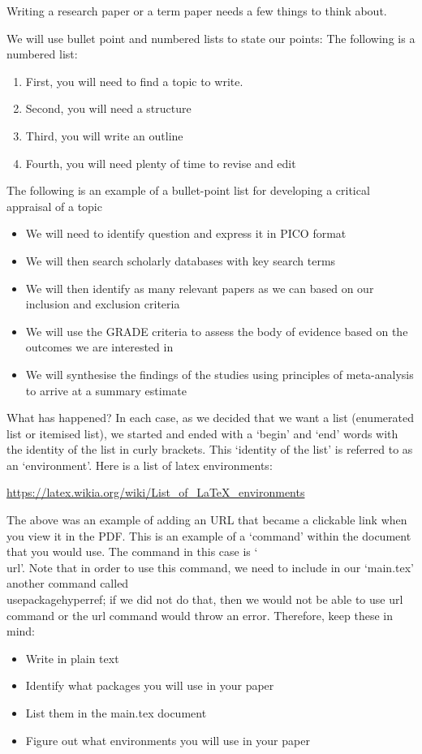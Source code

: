 Writing a research paper or a term paper needs a few things to think about. 

We will use bullet point and numbered lists to state our points:
The following is a numbered list:

\begin{enumerate}
    \item First, you will need to find a topic to write.
    \item Second, you will need a structure
    \item Third, you will write an outline
    \item Fourth, you will need plenty of time to revise and edit
\end{enumerate}

The following is an example of a bullet-point list for developing a critical appraisal of a topic

\begin{itemize}
    \item We will need to identify question and express it in PICO format
    \item We will then search scholarly databases with key search terms
    \item We will then identify as many relevant papers as we can based on our inclusion and exclusion criteria
    \item We will use the GRADE criteria to assess the body of evidence based on the outcomes we are interested in
    \item We will synthesise the findings of the studies using principles of meta-analysis to arrive at a summary estimate
\end{itemize}

What has happened? In each case, as we decided that we want a list (enumerated list or itemised list), we started and ended with a `begin' and `end' words with the identity of the list in curly brackets. This `identity of the list' is referred to as an `environment'. Here is a list of latex environments:

\url{https://latex.wikia.org/wiki/List_of_LaTeX_environments}

The above was an example of adding an URL that became a clickable link when you view it in the PDF. This is an example of a `command' within the document that you would use. The command in this case is `\\url'. Note that in order to use this command, we need to include in our `main.tex' another command called \\usepackage{hyperref}; if we did not do that, then we would not be able to use url command or the url command would throw an error. Therefore, keep these in mind:

\begin{itemize}
    \item Write in plain text
    \item Identify what packages you will use in your paper
    \item List them in the main.tex document
    \item Figure out what environments you will use in your paper
\end{itemize}

